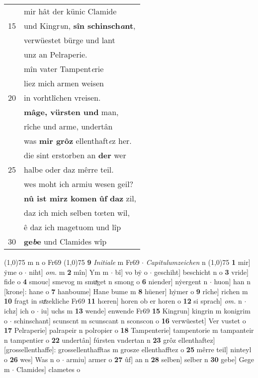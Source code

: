 \documentclass[8pt,a4paper,notitlepage]{article}
\begin{document}
\begin{table}[ht]
\begin{minipage}[t]{0.5\linewidth}
\begin{tabular}{rl}
 & mir hât der künic Clamide\\ 
15 & und Kingr\textit{u}n, \textbf{sîn schinsch\textit{a}nt},\\ 
 & verwüestet bürge und lant\\ 
 & unz an Pelraperie.\\ 
 & mîn vater Tampent\textit{e}rie\\ 
 & liez mich armen weisen\\ 
20 & in vorhtlîchen vreisen.\\ 
 & \textbf{mâge, vürsten und} man,\\ 
 & rîche und arme, undertân\\ 
 & was \textbf{mir grôz} ellenthaft\textit{e}z her.\\ 
 & die sint erstorben an \textbf{der} wer\\ 
25 & halbe oder daz mêrre teil.\\ 
 & wes moht ich armiu wesen geil?\\ 
 & \textbf{nû ist mirz komen} \textbf{ûf} \textbf{daz} zil,\\ 
 & daz ich mich selben tœten wil,\\ 
 & ê daz ich magetuom und lîp\\ 
30 & \textbf{ge\textit{b}e} und Clamides wîp\\ 
\end{tabular}
\scriptsize
\line(1,0){75} \newline
m n o Fr69 \newline
\line(1,0){75} \newline
\textbf{9} \textit{Initiale} m Fr69   $\cdot$ \textit{Capitulumzeichen} n  \newline
\line(1,0){75} \newline
\textbf{1} mir] ẏme o  $\cdot$ niht] \textit{om.} m \textbf{2} mîn] Ym m  $\cdot$ bî] vo bẏ o  $\cdot$ geschiht] beschicht n o \textbf{3} vride] fide o \textbf{4} smouc] smevog m smuͯget n smong o \textbf{6} niender] nẏergent n  $\cdot$ huon] han n [krone]: hane o \textbf{7} hanboume] Hane bume m \textbf{8} hüener] hẏmer o \textbf{9} rîche] richen m \textbf{10} fragt in suͤzekliche Fr69 \textbf{11} hœren] horen ob er horen o \textbf{12} si sprach] \textit{om.} n  $\cdot$ ichz] ich o  $\cdot$ iu] uchs m \textbf{13} wende] enwende Fr69 \textbf{15} Kingrun] kingrin m konigrim o  $\cdot$ schinschant] scunscnt m scunscant n sconscon o \textbf{16} verwüestet] Ver vustet o \textbf{17} Pelraperie] palrapeir n polropier o \textbf{18} Tampenterie] tampentorie m tampanteir n tampentier o \textbf{22} undertân] fúrsten vndertan n \textbf{23} grôz ellenthaftez] [grossellenthaffe]: grossellenthafftas m grosze ellenthafftez o \textbf{25} mêrre teil] ninteyl o \textbf{26} wes] Was n o  $\cdot$ armiu] armer o \textbf{27} ûf] an n \textbf{28} selben] selber n \textbf{30} gebe] Gege m  $\cdot$ Clamides] clametes o \newline
\end{minipage}
\end{table}
\end{document}
